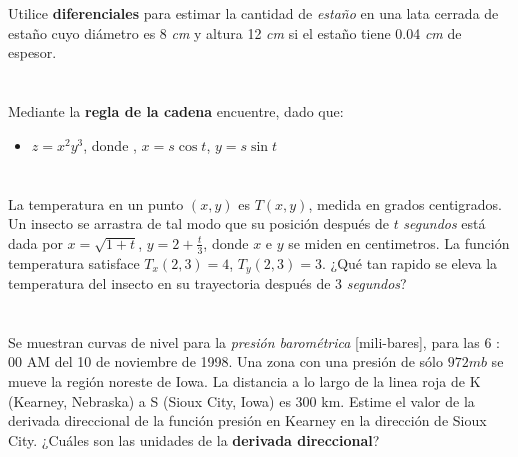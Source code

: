 \documentclass[12pt]{article}
\begin{document}
\section{}

Utilice \textbf{diferenciales} para estimar la cantidad de \textit{estaño} en una lata cerrada de estaño cuyo diámetro es 8 \textit{cm} y altura 12 \textit{cm} si el estaño tiene
0.04 \textit{cm} de espesor.

\section{}

Mediante la \textbf{regla de la cadena} encuentre, dado que:

\begin{itemize}[format=\textbf]

\item $z=x^2y^3$, donde , $x=s \cos{t}$, $y=s \sin{t}$

\end{itemize}

\section{}

La temperatura en un punto $(x, y)$ es $T(x, y)$, medida en grados centigrados. Un insecto se arrastra de tal modo que su posición después de $t$ \textit{segundos} está dada por $x =
\sqrt{1 + t}$, $y = 2 + \frac{t}{3}$, donde $x$ e $y$ se miden en centimetros. La función temperatura satisface $T_x(2, 3) = 4$, $T_y(2, 3) = 3$.
¿Qué tan rapido se eleva la temperatura del insecto en su trayectoria después de 3 \textit{segundos}?

\section{}

Se muestran curvas de nivel para la \textit{presión barométrica} [mili-bares], para las 6 : 00 AM del 10 de noviembre de 1998. Una zona con una presión de
sólo $972 mb$ se mueve la región noreste de Iowa. La distancia a lo largo de la linea roja de K (Kearney, Nebraska) a S (Sioux City, Iowa) es 300 km. Estime el valor de la derivada direccional de la función presión en Kearney en la dirección de Sioux City. ¿Cuáles son las unidades de la \textbf{derivada
  direccional}?
\end{document}
